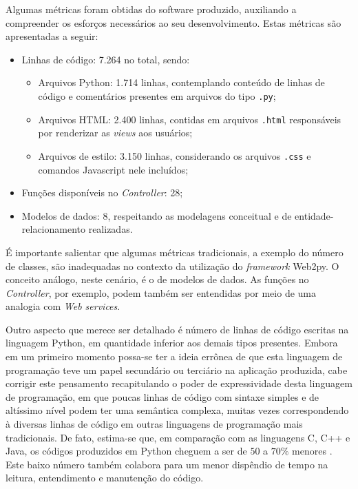 Algumas métricas foram obtidas do software produzido, auxiliando a compreender os esforços necessários ao seu desenvolvimento. Estas métricas são apresentadas a seguir:

\begin{itemize}
  \item Linhas de código: 7.264 no total, sendo:
  \begin{itemize}
    \item Arquivos Python: 1.714 linhas, contemplando conteúdo de linhas de código e comentários presentes em arquivos do tipo \texttt{.py};
    \item Arquivos HTML: 2.400 linhas, contidas em arquivos \texttt{.html} responsáveis por renderizar as \emph{views} aos usuários;
    \item Arquivos de estilo: 3.150 linhas, considerando os arquivos \texttt{.css} e comandos Javascript nele incluídos;
  \end{itemize}
  \item Funções disponíveis no \emph{Controller}: 28;
  \item Modelos de dados: 8, respeitando as modelagens conceitual e de entidade-relacionamento realizadas.
\end{itemize}

É importante salientar que algumas métricas tradicionais, a exemplo do número de classes, são inadequadas no contexto da utilização do \emph{framework} Web2py. O conceito análogo, neste cenário, é o de modelos de dados.  As funções no \emph{Controller}, por exemplo, podem também ser entendidas por meio de uma analogia com \emph{Web services}.

Outro aspecto que merece ser detalhado é número de linhas de código escritas na linguagem Python, em quantidade inferior aos demais tipos presentes. Embora em um primeiro momento possa-se ter a ideia errônea de que esta linguagem de programação teve um papel secundário ou terciário na aplicação produzida, cabe corrigir este pensamento recapitulando o poder de expressividade desta linguagem de programação, em que poucas linhas de código com sintaxe simples e de altíssimo nível podem ter uma semântica complexa, muitas vezes correspondendo à diversas linhas de código em outras linguagens de programação mais tradicionais. De fato, estima-se que, em comparação com as linguagens C, C++ e Java, os códigos produzidos em Python cheguem a ser de $50$ a $70\%$ menores \cite{Lutz:AprendendoPython}. Este baixo número também colabora para um menor dispêndio de tempo na leitura, entendimento e manutenção do código.
